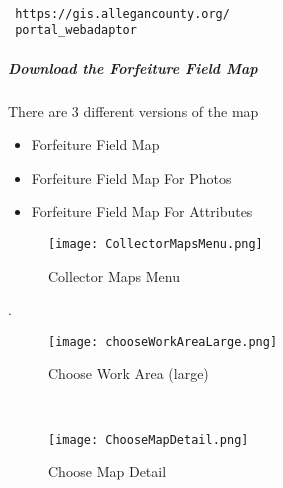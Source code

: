 \vspace{.1in}

 \begin{verbatim}

 https://gis.allegancounty.org/
 portal_webadaptor

 \end{verbatim}

  \vspace{.25in}

 \vspace{2in}

  \vspace{1in}


  \clearpage
  \subparagraph[Download the Forfeiture Field Map]{Download the Forfeiture Field Map \texorpdfstring{\\}{}}
  \noindent There are 3 different versions of the map
  \vspace{.05in}

  \begin{itemize}
  \item Forfeiture Field Map
  \item Forfeiture Field Map For Photos
  \item Forfeiture Field Map For Attributes
  \end{itemize}

  \begin{wrapfigure}{r}{0.6\textwidth}
  \centering
      \texttt{[image: CollectorMapsMenu.png]}
  \caption{Collector Maps Menu}
  \end{wrapfigure}
 .
  \vspace{.5in}

  \vspace{1.75in}


  \clearpage
  \begin{wrapfigure}{r}{0.6\textwidth}
  \centering
      \texttt{[image: chooseWorkAreaLarge.png]}
  \caption{Choose Work Area (large)}
  
  \HRule \\[.4cm] %
  \vspace{.1in}

      \texttt{[image: ChooseMapDetail.png]}
  \caption{Choose Map Detail}
  \vspace{-.1in}

  \end{wrapfigure}

